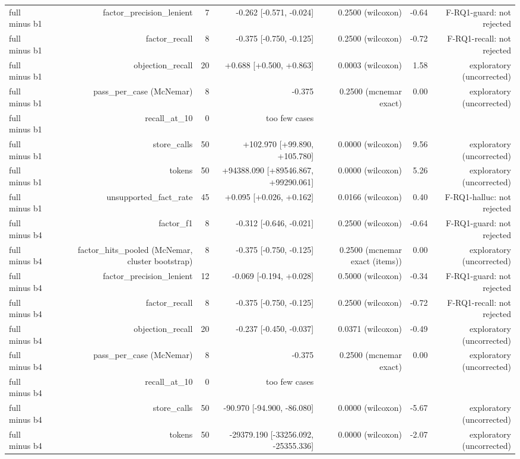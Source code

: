 \begin{table}[t]
\begin{adjustbox}{max width=\textwidth}
\begin{tabular}{lrrrrrr}
full minus b1 & factor\_precision\_lenient & 7 & -0.262 [-0.571, -0.024] & 0.2500 (wilcoxon) & -0.64 & F-RQ1-guard: not rejected \\
full minus b1 & factor\_recall & 8 & -0.375 [-0.750, -0.125] & 0.2500 (wilcoxon) & -0.72 & F-RQ1-recall: not rejected \\
full minus b1 & objection\_recall & 20 & +0.688 [+0.500, +0.863] & 0.0003 (wilcoxon) & 1.58 & exploratory (uncorrected) \\
full minus b1 & pass\_per\_case (McNemar) & 8 & -0.375 & 0.2500 (mcnemar exact) & 0.00 & exploratory (uncorrected) \\
full minus b1 & recall\_at\_10 & 0 & too few cases &  &  &  \\
full minus b1 & store\_calls & 50 & +102.970 [+99.890, +105.780] & 0.0000 (wilcoxon) & 9.56 & exploratory (uncorrected) \\
full minus b1 & tokens & 50 & +94388.090 [+89546.867, +99290.061] & 0.0000 (wilcoxon) & 5.26 & exploratory (uncorrected) \\
full minus b1 & unsupported\_fact\_rate & 45 & +0.095 [+0.026, +0.162] & 0.0166 (wilcoxon) & 0.40 & F-RQ1-halluc: not rejected \\
full minus b4 & factor\_f1 & 8 & -0.312 [-0.646, -0.021] & 0.2500 (wilcoxon) & -0.64 & F-RQ1-guard: not rejected \\
full minus b4 & factor\_hits\_pooled (McNemar, cluster bootstrap) & 8 & -0.375 [-0.750, -0.125] & 0.2500 (mcnemar exact (items)) & 0.00 & exploratory (uncorrected) \\
full minus b4 & factor\_precision\_lenient & 12 & -0.069 [-0.194, +0.028] & 0.5000 (wilcoxon) & -0.34 & F-RQ1-guard: not rejected \\
full minus b4 & factor\_recall & 8 & -0.375 [-0.750, -0.125] & 0.2500 (wilcoxon) & -0.72 & F-RQ1-recall: not rejected \\
full minus b4 & objection\_recall & 20 & -0.237 [-0.450, -0.037] & 0.0371 (wilcoxon) & -0.49 & exploratory (uncorrected) \\
full minus b4 & pass\_per\_case (McNemar) & 8 & -0.375 & 0.2500 (mcnemar exact) & 0.00 & exploratory (uncorrected) \\
full minus b4 & recall\_at\_10 & 0 & too few cases &  &  &  \\
full minus b4 & store\_calls & 50 & -90.970 [-94.900, -86.080] & 0.0000 (wilcoxon) & -5.67 & exploratory (uncorrected) \\
full minus b4 & tokens & 50 & -29379.190 [-33256.092, -25355.336] & 0.0000 (wilcoxon) & -2.07 & exploratory (uncorrected) \\

\end{tabular}
\end{adjustbox}
\end{table}
